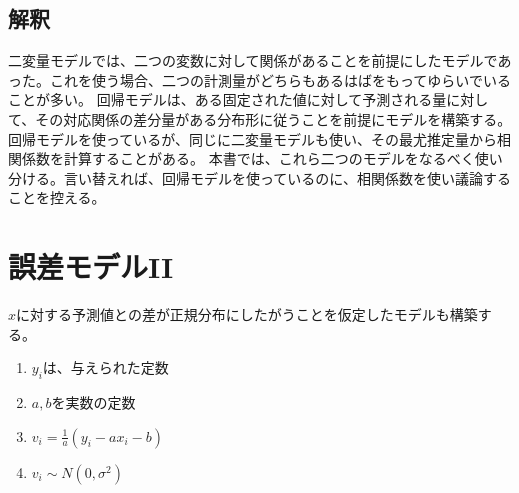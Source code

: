 \subsection{解釈}
二変量モデルでは、二つの変数に対して関係があることを前提にしたモデルであった。これを使う場合、二つの計測量がどちらもあるはばをもってゆらいでいることが多い。
回帰モデルは、ある固定された値に対して予測される量に対して、その対応関係の差分量がある分布形に従うことを前提にモデルを構築する。
回帰モデルを使っているが、同じに二変量モデルも使い、その最尤推定量から相関係数を計算することがある。
本書では、これら二つのモデルをなるべく使い分ける。言い替えれば、回帰モデルを使っているのに、相関係数を使い議論することを控える。



\section{誤差モデルII}
$x$に対する予測値との差が正規分布にしたがうことを仮定したモデルも構築する。
\begin{enumerate}
 \item $y_i$は、与えられた定数
 \item $a,b$を実数の定数
 \item $v_i = \frac{1}{a}(y_i-a x_i -b)$
 \item $v_i \sim N(0,\sigma^2)$
\end{enumerate}
